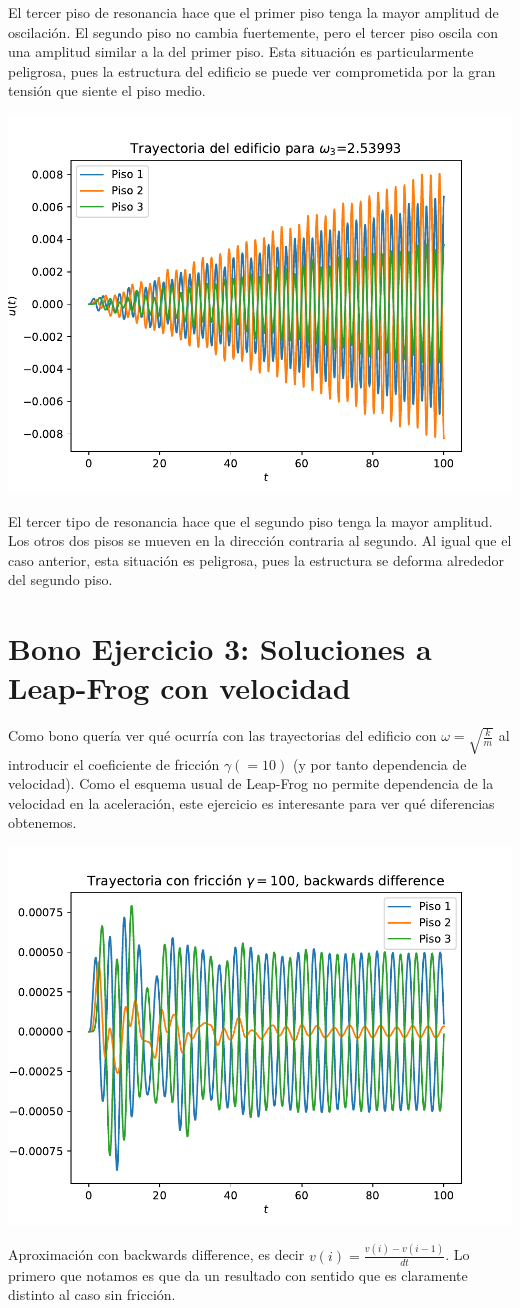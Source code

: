 \documentclass[11pt,letterpaper]{exam}
\begin{document}
El tercer piso de resonancia hace que el primer piso tenga la mayor amplitud de oscilación. El segundo piso no cambia fuertemente, pero el tercer piso oscila con una amplitud similar a la del primer piso. Esta situación es particularmente peligrosa, pues la estructura del edificio se puede ver comprometida por la gran tensión que siente el piso medio.
\begin{center}
\includegraphics[width=14cm]{3_Edificio_omega3.pdf}
\end{center}
El tercer tipo de resonancia hace que el segundo piso tenga la mayor amplitud. Los otros dos pisos se mueven en la dirección contraria al segundo. Al igual que el caso anterior, esta situación es peligrosa, pues la estructura se deforma alrededor del segundo piso.

\section{Bono Ejercicio 3: Soluciones a Leap-Frog con velocidad}
Como bono quería ver qué ocurría con las trayectorias del edificio con $\omega = \sqrt{\frac{k}{m}}$ al introducir el coeficiente de fricción $\gamma(=10)$ (y por tanto dependencia de velocidad). Como el esquema usual de Leap-Frog no permite dependencia de la velocidad en la aceleración, este ejercicio es interesante para ver qué diferencias obtenemos.

\begin{center}
\includegraphics[width=14cm]{3_Edificio_bono.pdf}
\end{center}
Aproximación con backwards difference, es decir $v(i)=\frac{v(i)-v(i-1)}{dt}$. Lo primero que notamos es que da un resultado con sentido que es claramente distinto al caso sin fricción.
\end{document}
